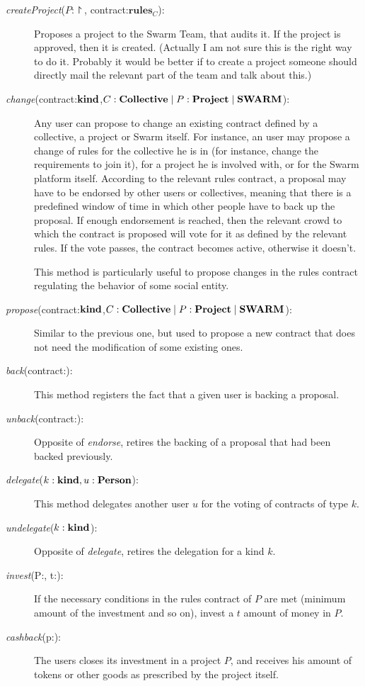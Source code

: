 \documentclass[submission, copyright,creativecommons,sharealike,noncommercial]{eptcs}
\begin{document}
\begin{description}
		\item[\emph{createProject}($P:\project$, contract:$\textbf{rules}_C$):] Proposes a project to the Swarm Team, that audits it. If the project is approved, then it is created. (Actually I am not sure this is the right way to do it. Probably it would be better if to create a project someone should directly mail the relevant part of the team and talk about this.)
		
		\item[\emph{change}(contract:$\textbf{kind}$,$C:\textbf{Collective} \mid P:\textbf{Project} \mid \textbf{SWARM}$):] Any user can propose to change an existing contract defined by a collective, a project or Swarm itself. For instance, an user may propose a change of rules for the collective he is in (for instance, change the requirements to join it), for a project he is involved with, or for the Swarm platform itself. According to the relevant rules contract, a proposal may have to be endorsed by other users or collectives, meaning that there is a predefined window of time in which other people have to back up the proposal. If enough endorsement is reached, then the relevant crowd to which the contract is proposed will vote for it as defined by the relevant rules. If the vote passes, the contract becomes active, otherwise it doesn't.
		
		This method is particularly useful to propose changes in the rules contract regulating the behavior of some social entity.
		
		\item[\emph{propose}(contract:$\textbf{kind}$,$C:\textbf{Collective} \mid P:\textbf{Project} \mid \textbf{SWARM}$):] Similar to the previous one, but used to propose a new contract that does not need the modification of some existing ones.
		
		\item[\emph{back}(contract:\kind):] This method registers the fact that a given user is backing a proposal.
		
		\item[\emph{unback}(contract:\kind):] Opposite of \emph{endorse}, retires the backing of a proposal that had been backed previously.
		
		\item[\emph{delegate}($k:\textbf{kind}, u:\textbf{Person}$):] This method delegates another user $u$ for the voting of contracts of type $k$.
		
		\item[\emph{undelegate}($k:\textbf{kind}$):] Opposite of \emph{delegate}, retires the delegation for a kind $k$.
		
		
		\item[\emph{invest}(P:\project, t:\token):] If the necessary conditions in the rules contract of $P$ are met (minimum amount of the investment and so on), invest a $t$ amount of money in $P$. 
		
		\item[\emph{cashback}(p:\project):] The users closes its investment in a project $P$, and receives his amount of tokens or other goods as prescribed by the project itself.
		
		
		
	\end{description}
	
	
\end{document}
